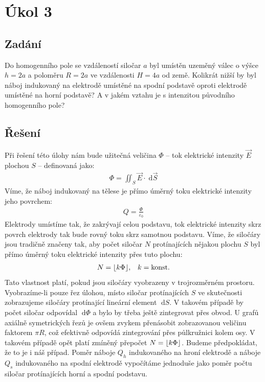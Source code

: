 \documentclass[10pt,a4paper]{article}
\DeclarePairedDelimiter\floor{\lfloor}{\rfloor}
\newcommand{\const}[1]{\text{#1}}
\renewcommand{\d}[1]{\;\const{d}#1}
\begin{document}
\section*{Úkol 3}

\subsection*{Zadání}
Do homogenního pole se vzdáleností siločar $a$ byl umístěn uzeměný válec o výšce $h=2a$ a poloměru $R=2a$ ve vzdálenosti $H=4a$ od země. Kolikrát nižší by byl náboj indukovaný na elektrodě umístěné na spodní podstavě oproti elektrodě umístěné na horní podstavě? A v jakém vztahu je s intenzitou původního homogenního pole?

\subsection*{Řešení}
Při řešení této úlohy nám bude užitečná veličina $\Phi$ – tok elektrické intenzity $\vec{E}$ plochou $S$ – definovaná jako:
\begin{align*}
    \Phi = \iint_S \vec{E} \cdot \d{\vec{S}}
\end{align*}
Víme, že náboj indukovaný na tělese je přímo úměrný toku elektrické intenzity jeho povrchem:
\begin{align*}
    Q = \frac{\Phi}{\varepsilon_0}
\end{align*}
Elektrody umístíme tak, že zakrývají celou podstavu, tok elektrické intenzity skrz povrch elektrody tak bude rovný toku skrz samotnou podstavu. Víme, že siločáry jsou tradičně značeny tak, aby počet siločar $N$ protínajících nějakou plochu $S$ byl přímo úměrný toku elektrické intenzity přes tuto plochu:
\begin{align*}
    N = \floor{k\Phi}, \;\;\; k = \const{konst.}
\end{align*}
Tato vlastnost platí, pokud jsou siločáry vyobrazeny v trojrozměrném prostoru. Vyobrazíme-li pouze řez úlohou, místo siločar protínajících $S$ ve skutečnosti zobrazujeme siločáry protínající lineární element $\d{S}$. V takovém případě by počet siločar odpovídal $\d{\Phi}$ a bylo by třeba ještě zintegrovat přes obvod.
U grafů axiálně symetrických řezů je ovšem zvykem přenásobit zobrazovanou veličinu faktorem $\pi R$, což efektivně odpovídá zintegrování přes půlkružnici kolem osy. V takovém případě opět platí zmíněný přepočet $N = \floor{k\Phi}$. Budeme předpokládat, že to je i náš případ. Poměr náboje $Q_h$ indukovaného na hroní elektrodě a náboje $Q_s$ indukovaného na spodní elektrodě vypočítáme jednoduše jako poměr počtu siločar protínajících horní a spodní podstavu.
\end{document}
